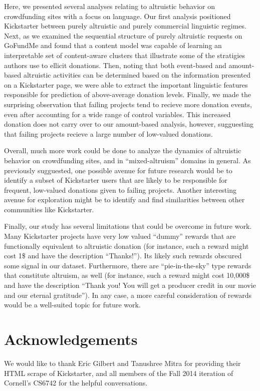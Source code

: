 \documentclass[letterpaper]{article}
\begin{document}
Here, we presented several analyses relating to altruistic behavior on crowdfunding sites with a focus on language. Our first analysis positioned Kickstarter between purely altruistic and purely commercial linguistic regimes. Next, as we examined the sequential structure of purely altruistic requests on GoFundMe and found that a content model was capable of learning an interpretable set of content-aware clusters that illustrate some of the stratigies authors use to ellicit donations. Then, noting that both event-based and amount-based altruistic activities can be determined based on the information presented on a Kickstarter page, we were able to extract the important linguistic features responsible for prediction of above-average donation levels. Finally, we made the surprising observation that failing projects tend to recieve more donation events, even after accounting for a wide range of control variables. This increased donation does not carry over to our amount-based analysis, however, sugguesting that failing projects recieve a large number of low-valued donations.

Overall, much more work could be done to analyze the dynamics of altruistic behavior on crowdfunding sites, and in ``mixed-altruism'' domains in general. As previously sugguested, one possible avenue for future research would be to identify a subset of Kickstarter users that are likely to be responsible for frequent, low-valued donations given to failing projects. Another interesting avenue for exploration might be to identify and find similarities between other communities like Kickstarter.

Finally, our study has several limitations that could be overcome in future work. Many Kickstarter projects have very low valued ``dummy'' rewards that are functionally equivalent to altruistic donation (for instance, such a reward might cost 1\$ and have the description ``Thanks!''). Its likely such rewards obscured some signal in our dataset. Furthermore, there are ``pie-in-the-sky'' type rewards that constitute altruism, as well (for instance, such a reward might cost 10,000\$ and have the description ``Thank you! You will get a producer credit in our movie and our eternal gratitude''). In any case, a more careful consideration of rewards would be a well-suited topic for future work.

\section{Acknowledgements}

We would like to thank Eric Gilbert and Tanushree Mitra for providing their HTML scrape of Kickstarter, and all members of the Fall 2014 iteration of Cornell's CS6742 for the helpful conversations.

 
\end{document}
